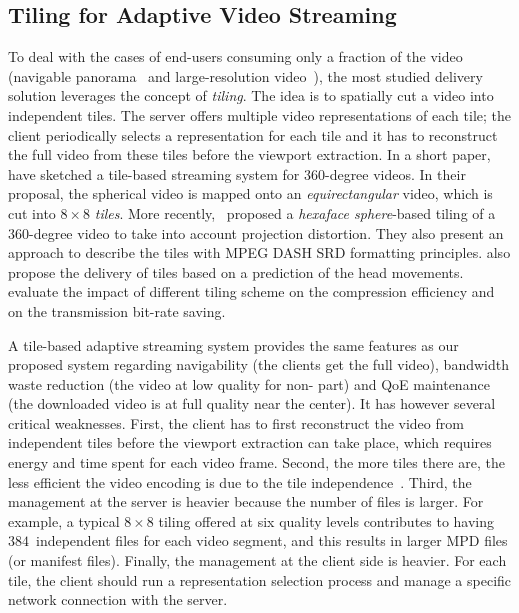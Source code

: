 \subsection{Tiling for Adaptive Video Streaming}
To deal with the cases of end-users consuming only a fraction of the
video (navigable
panorama~\cite{sanchez_compressed_2015,wang_mixing_2014,gaddam_tiling_2015}
and large-resolution video~\cite{jean16mmsys}), the most studied delivery solution
leverages the concept
of \emph{tiling}.
The idea is to
spatially cut a video into independent tiles. The server offers
multiple video representations of each tile; the client periodically
selects a representation for each tile and it has to reconstruct the
full video from these tiles before the viewport extraction.
In a short paper,~\citet{ochi_live_2015} have sketched a
tile-based streaming system for $360$-degree videos. In their proposal,
the spherical video is mapped onto an \emph{equirectangular} video,
which is cut into $8\!\times\! 8$ \emph{tiles}.
More recently,~\citet{vishyArxiv} proposed a \emph{hexaface sphere}-based tiling
of a $360$-degree video to take into account projection distortion. They also present
an approach to describe the tiles with \ac{MPEG} \ac{DASH} \ac{SRD}
formatting principles. \citet{allthings} also propose the delivery of tiles based on
a prediction of the head movements. \citet{zare2016hevc} evaluate the impact of
different tiling scheme on the compression efficiency and on the transmission
bit-rate saving.

A tile-based adaptive streaming system provides the same features as
our proposed system regarding navigability (the clients get the full
video), bandwidth waste reduction (the video at low quality for
non-\FoV{} part) and \ac{QoE} maintenance (the downloaded video is
at full quality near the \FoV{} center). It has however several
critical weaknesses. First, the client has to first reconstruct the
video from independent tiles before the viewport extraction can take
place, which requires energy and time spent for each video frame.
Second, the more tiles there are, the less efficient the video
encoding is due to the tile
independence~\cite{sanchez_compressed_2015}. Third, the management at
the server is heavier because the number of files is larger. For
example, a typical $8\times8$ tiling offered at six quality levels
contributes to having $384$~independent files for each video segment,
and this results in larger \ac{MPD} files (or manifest
files). Finally, the management at the client side is heavier. %
For each tile, the client should run a representation selection
process and manage a specific network connection with the server.

